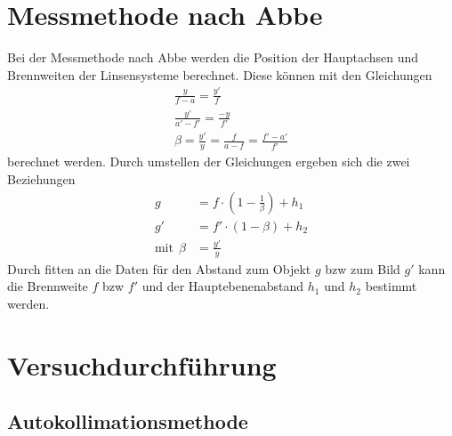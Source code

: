 \documentclass[11pt, a4paper]{article}
\begin{document}
    \section{Messmethode nach Abbe}
    Bei der Messmethode nach Abbe werden die Position der Hauptachsen und Brennweiten der Linsensysteme berechnet. Diese können mit den Gleichungen
    \begin{align}
        \frac{y}{f-a} = \frac{y'}{f} \\
        \frac{y'}{a'-f'} = \frac{-y}{f'} \\
        \beta = \frac{y'}{y} = \frac{f}{a-f} = \frac{f'-a'}{f'}
    \end{align}
    berechnet werden. Durch umstellen der Gleichungen ergeben sich die zwei Beziehungen
    \begin{align}
        g &= f \cdot \left(1 - \frac{1}{\beta}\right) + h_1 \label{eq:dicke1} \\
        g' &= f' \cdot (1 - \beta) + h_2 \label{eq:dicke2} \\
        \text{mit} \ \ \beta &= \frac{y'}{y}
    \end{align}
    Durch fitten an die Daten für den Abstand zum Objekt $g$ bzw zum Bild $g'$ kann die Brennweite $f$ bzw $f'$ und der Hauptebenenabstand $h_1$ und $h_2$ bestimmt werden.

    \section{Versuchdurchführung}

    \subsection{Autokollimationsmethode} %
\end{document}
